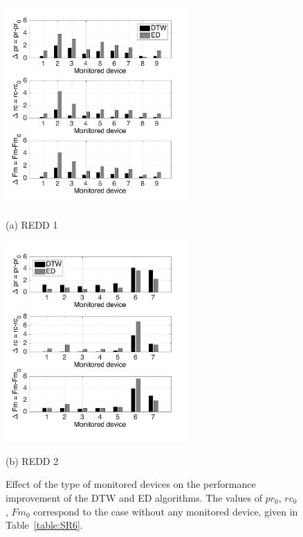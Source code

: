\begin{figure}[htb]
\begin{minipage}[b]{0.48\linewidth}
  \centering
  \centerline{\includegraphics[width=7cm]{./chapters/chapter5/images/R1_ed_1modev.pdf}}
  \centerline{(a) REDD 1}\medskip
\end{minipage}
%
\hfill
\begin{minipage}[b]{.48\linewidth}
  \centering
  \centerline{\includegraphics[width=7cm]{./chapters/chapter5/images/R2_ed_1modev.pdf}}
  \centerline{(b) REDD 2}\medskip
\end{minipage}

\caption{Effect of the type of monitored devices on the performance improvement of the DTW and ED algorithms. The values of $pr_0$, $rc_0$, $Fm_0$ correspond to the case without any monitored device, given in Table~\ref{table:SR6}.}
\label{fig:SR5}
%
\end{figure}



